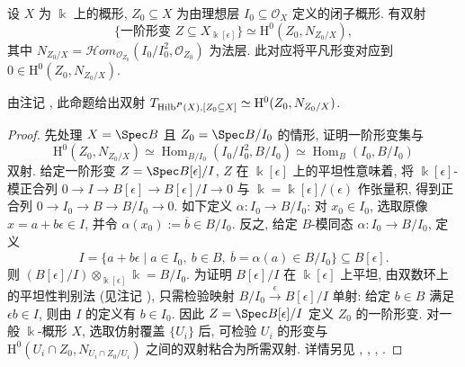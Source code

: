 \begin{proposition}\label{src:C.1.3}
设 $X$ 为 $\Bbbk$ 上的概形, $Z_0\subseteq X$ 为由理想层 $I_0\subseteq\mathcal O_X$ 定义的闭子概形. 有双射
\[
\{\text{一阶形变 }Z\subseteq X_{\Bbbk[\epsilon]}\}\simeq\mathrm H^0(Z_0,N_{Z_0/X}),
\]
其中 $N_{Z_0/X}=\mathcal Hom_{\mathcal O_{Z_0}}(I_0/I_0^2,\mathcal O_{Z_0})$ 为法层. 此对应将平凡形变对应到 $0\in\mathrm H^0(Z_0,N_{Z_0/X})$.
\end{proposition}
\begin{remark}\label{src:C.1.4}
由注记 , 此命题给出双射 $T_{\operatorname{Hilb}^P(X),[Z_0\subseteq X]}\simeq\mathrm H^0(Z_0,N_{Z_0/X})$.
\end{remark}
\begin{proof}
先处理 $X=\Spec B$ 且 $Z_0=\Spec B/I_0$ 的情形, 证明一阶形变集与
\[
\mathrm H^0(Z_0,N_{Z_0/X})\simeq\operatorname{Hom}_{B/I_0}(I_0/I_0^2,B/I_0)\simeq\operatorname{Hom}_B(I_0,B/I_0)
\]
双射. 给定一阶形变 $Z=\Spec B[\epsilon]/I$, $Z$ 在 $\Bbbk[\epsilon]$ 上的平坦性意味着, 将 $\Bbbk[\epsilon]$-模正合列 $0\to I\to B[\epsilon]\to B[\epsilon]/I\to0$ 与 $\Bbbk=\Bbbk[\epsilon]/(\epsilon)$ 作张量积, 得到正合列 $0\to I_0\to B\to B/I_0\to0$. 如下定义 $\alpha:I_0\to B/I_0$: 对 $x_0\in I_0$, 选取原像 $x=a+b\epsilon\in I$, 并令 $\alpha(x_0):=\overline b\in B/I_0$. 反之, 给定 $B$-模同态 $\alpha:I_0\to B/I_0$, 定义
\[
I=\{a+b\epsilon\mid a\in I_0,\ b\in B,\ \overline b=\alpha(a)\in B/I_0\}\subseteq B[\epsilon].
\]
则 $(B[\epsilon]/I)\otimes_{\Bbbk[\epsilon]}\Bbbk=B/I_0$. 为证明 $B[\epsilon]/I$ 在 $\Bbbk[\epsilon]$ 上平坦, 由双数环上的平坦性判别法 (见注记 ), 只需检验映射 $B/I_0\xrightarrow{\epsilon}B[\epsilon]/I$ 单射: 给定 $b\in B$ 满足 $\epsilon b\in I$, 则由 $I$ 的定义有 $b\in I_0$. 因此 $Z=\Spec B[\epsilon]/I$ 定义 $Z_0$ 的一阶形变. 对一般 $\Bbbk$-概形 $X$, 选取仿射覆盖 $\{U_i\}$ 后, 可检验 $U_i$ 的形变与 $\mathrm H^0(U_i\cap Z_0,N_{U_i\cap Z_0/U_i})$ 之间的双射粘合为所需双射. 详情另见 \cite[定理 $6.1$]{Art76}, \cite[定理 $2.8$]{Kol96}, \cite[命题 $3.2.1$]{Ser06}, \cite[命题 $2.3$]{Har10}.
\end{proof}

